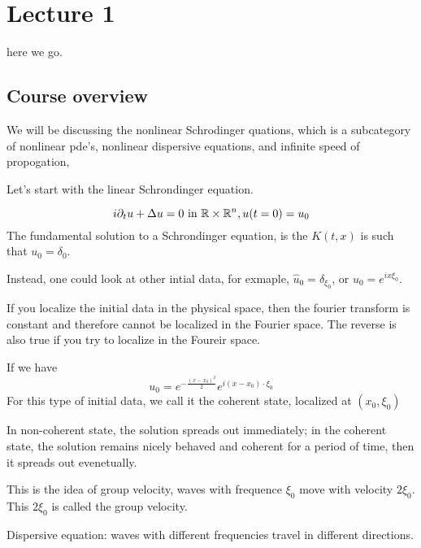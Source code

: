 \chapter{Lecture 1}

here we go.

\section*{Course overview}
We will be discussing the nonlinear Schrodinger quations, which is a subcategory of nonlinear pde's, nonlinear dispersive equations, and infinite speed of propogation, 

Let's start with the linear Schrondinger equation.

\begin{equation*}
    i\partial_tu+\Delta u=0 \text{ in } \mathbb{R}\times\mathbb{R}^n, u(t=0)=u_0
\end{equation*}
The fundamental solution to a Schrondinger equation, is the $K(t,x)$ is such that $u_0=\delta_0$.

Instead, one could look at other intial data, for exmaple, $\widehat{u}_0=\delta_{\xi_0}$, or $u_0=e^{ix\xi_0}$.

\begin{remark}
    If you localize the initial data in the physical space, then the fourier transform is constant and therefore cannot be localized in the Fourier space. The reverse is also true if you try to localize in the Foureir space.
\end{remark}

If we have
\begin{equation*}
    u_0=e^{-\frac{(x-x_0)^2}{2}}e^{i(x-x_0)\cdot\xi_0}
\end{equation*}
For this type of initial data, we call it the coherent state, localized at $(x_0, \xi_0)$

In non-coherent state, the solution spreads out immediately; in the coherent state, the solution remains nicely behaved and coherent for a period of time, then it spreads out evenetually.

\begin{remark}
    This is the idea of group velocity, waves with frequence $\xi_0$ move with velocity $2\xi_0$. This $2\xi_0$ is called the group velocity. 
\end{remark}

Dispersive equation: waves with different frequencies travel in different directions.


